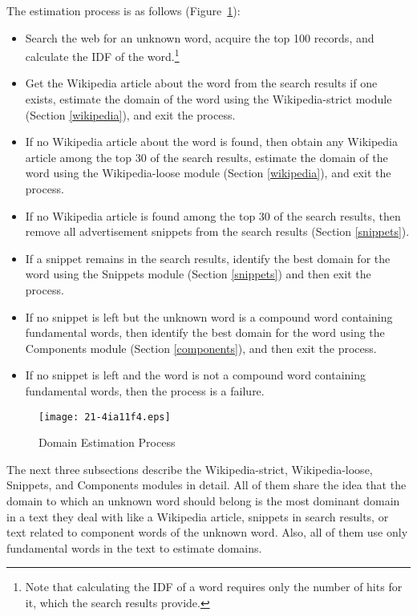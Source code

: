 \documentclass[english]{jnlp_1.4_rep}
\newcommand{\BAngou}[1]{}
\begin{document}
The estimation process is as follows (Figure~\ref{estimation-pic}):
\begin{itemize}
 \item[\BAngou{1}] Search the web for an unknown word, acquire the top
	    100 records, and calculate the IDF of the
	    word.\footnote{Note that calculating the IDF of a word
	    requires only the number of hits for it, which the search
	    results provide.}
 \item[\BAngou{2}] Get the Wikipedia article about the word from the
	    search results if one exists, estimate the domain of the word 
	    using the Wikipedia-strict module (Section \ref{wikipedia}),
	    and exit the process.
 \item[\BAngou{3}] If no Wikipedia article about the word is found,
	    then obtain any Wikipedia article among the top 30 of the search
	    results, estimate the domain of the word using the
	    Wikipedia-loose module (Section \ref{wikipedia}), and exit
	    the process.
 \item[\BAngou{4}] If no Wikipedia article is found among the top 30 of the
	    search results, then remove all advertisement snippets from the
	    search results (Section \ref{snippets}).
 \item[\BAngou{5}] If a snippet remains in the search results, identify
	    the best domain for the word using the Snippets module
	    (Section \ref{snippets})
	    and then exit the process.
 \item[\BAngou{6}] If no snippet is left but the unknown word is a
	    compound word containing fundamental words, then identify
	    the best domain for the word using the Components module
	    (Section \ref{components}),
	    and then exit the process.
 \item[\BAngou{7}] If no snippet is left and the word is not a compound
	    word containing fundamental words, then the process is a
	    failure.
\end{itemize}

\begin{figure}[t]
\begin{center}
\texttt{[image: 21-4ia11f4.eps]}
\end{center}
\caption{Domain Estimation Process}
\label{estimation-pic}
\end{figure}

The next three subsections describe the Wikipedia-strict,
Wikipedia-loose, Snippets, and Components modules in detail.
All of them share the idea that the domain to which an unknown word
should belong is the most
dominant domain in a text they deal with like a Wikipedia article,
snippets in search results, or text related to component words of the
unknown word.
Also, all of them use only fundamental words in the text to estimate
domains.
\end{document}
